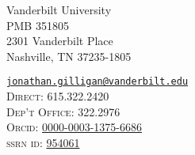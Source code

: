 \noindent
\parbox[t]{0.45\textwidth}{%
Vanderbilt University\\
PMB 351805\\
2301 Vanderbilt Place\\
Nashville, TN 37235-1805
}
\parbox[t]{0.5\textwidth}{\raggedleft
	{%
    \href{mailto:jonathan.gilligan@vanderbilt.edu}{\nolinkurl{jonathan.gilligan@vanderbilt.edu}}%
	}\\
    \textsc{Direct:} 615.322.2420\\
    \textsc{Dep't Office:} 322.2976\\
    \textsc{Orcid:} \href{https://orcid.org/0000-0003-1375-6686}{0000-0003-1375-6686}\\
    \textsc{ssrn id:} \href{https://papers.ssrn.com/sol3/cf_dev/AbsByAuth.cfm?per_id=954061}{954061}\\
    \qquad{}
}
